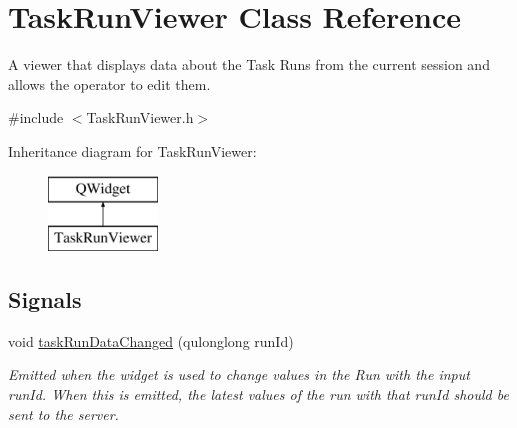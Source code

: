 \hypertarget{class_task_run_viewer}{\section{Task\-Run\-Viewer Class Reference}
\label{class_task_run_viewer}
}


A viewer that displays data about the Task Runs from the current session and allows the operator to edit them.  




{\ttfamily \#include $<$Task\-Run\-Viewer.\-h$>$}

Inheritance diagram for Task\-Run\-Viewer\-:\begin{figure}[H]
\begin{center}
\leavevmode
\includegraphics[height=2.000000cm]{class_task_run_viewer}
\end{center}
\end{figure}
\subsection*{Signals}
\begin{DoxyCompactItemize}
\item 
void \hyperlink{class_task_run_viewer_a22b9bd020d482ef8bd1dce2c17e32332}{task\-Run\-Data\-Changed} (qulonglong run\-Id)
\begin{DoxyCompactList}\small\item\em Emitted when the widget is used to change values in the Run with the input run\-Id. When this is emitted, the latest values of the run with that run\-Id should be sent to the server. \end{DoxyCompactList}\end{DoxyCompactItemize}
